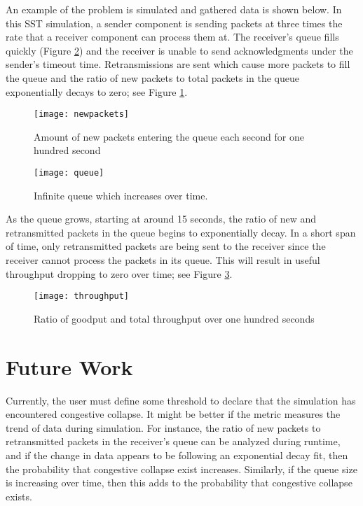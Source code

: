\documentclass{article}
\begin{document}

An example of the problem is simulated and gathered data is shown below. In this SST simulation, a sender component is sending packets at three times the rate that a receiver component can process them at. The receiver's queue fills quickly (Figure \ref{fig-queue}) and the receiver is unable to send acknowledgments under the sender's timeout time. Retransmissions are sent which cause more packets to fill the queue and the ratio of new packets to total packets in the queue exponentially decays to zero; see Figure \ref{fig-packets}.

\begin{figure}[H]
	\texttt{[image: newpackets]}
	\centering
	\caption{Amount of new packets entering the queue each second for one hundred second}
	\label{fig-packets}
\end{figure}

\begin{figure}[H]
	\texttt{[image: queue]}
	\centering
	\caption{Infinite queue which increases over time.}
	\label{fig-queue}
\end{figure}

As the queue grows, starting at around 15 seconds, the ratio of new and retransmitted packets in the queue begins to exponentially decay. In a short span of time, only retransmitted packets are being sent to the receiver since the receiver cannot process the packets in its queue. This will result in useful throughput dropping to zero over time; see Figure \ref{fig-ratio}.

\begin{figure}[H]
	\texttt{[image: throughput]}
	\centering
	\caption{Ratio of goodput and total throughput over one hundred seconds}
	\label{fig-ratio}
\end{figure}

\section{Future Work}
Currently, the user must define some threshold to declare that the simulation has encountered congestive collapse. It might be better if the metric measures the trend of data during simulation. For instance, the ratio of new packets to retransmitted packets in the receiver's queue can be analyzed during runtime, and if the change in data appears to be following an exponential decay fit, then the probability that congestive collapse exist increases. Similarly, if the queue size is increasing over time, then this adds to the probability that congestive collapse exists.



\end{document}

